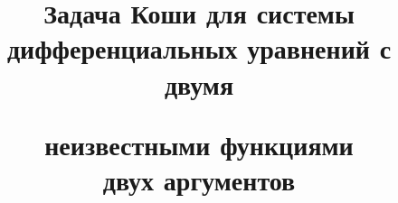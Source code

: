 

 


% 


\newcommand{\myfrac}[2]{\frac{\partial #1}{\partial #2}} 


\newcommand{\tts}[1]{} 


\renewcommand{\baselinestretch}{0.95}


 




 


\setcounter{page}{48} 












 


\author{\it{}} 




\title{Задача Коши для системы дифференциальных уравнений с двумя 


неизвестными функциями\\ двух аргументов} 


 


\date{} 




\pagestyle{plain} %


 




\maketitle 



